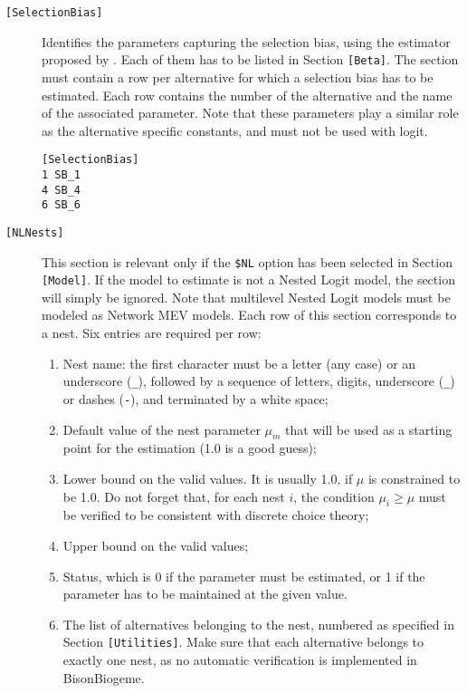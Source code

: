 \documentclass[12pt,a4paper]{article}
\newcommand{\specitem}[1]{\texttt{[#1]}}
\newcommand{\BBIOGEME}{BisonBiogeme}
\begin{document}
\begin{description}
     \item[\specitem{SelectionBias}]
 Identifies the parameters
       capturing the selection bias, using the estimator proposed by . Each of them has to  be listed in
         Section \verb+[Beta]+. The section must contain a
         row per alternative for which a selection bias has to be
         estimated. Each row contains the number of the alternative
         and the name of the associated parameter. Note that these parameters play a similar role as the alternative specific constants, and must not be used with logit. 
\begin{verbatim}
[SelectionBias]
1 SB_1
4 SB_4
6 SB_6
\end{verbatim}
         
      \item[\specitem{NLNests}] This section is relevant only if the
      \verb+$NL+ option has been selected in Section \verb+[Model]+. 
     If the model to estimate is not a  Nested Logit model, the
     section will simply be
       ignored. Note that multilevel Nested Logit models must be modeled as Network MEV models.
      Each row of this section corresponds to a nest. Six entries are required per row:
      \begin{enumerate}
         \item Nest name:   the first character must be a letter (any case) or an underscore
            (\verb+_+), followed by a sequence of letters, digits, underscore (\verb+_+)
            or dashes (\verb+-+), and terminated by a white space;
         \item Default value of the nest parameter $\mu_m$ that will be used as a
            starting point for the estimation (1.0 is a good guess);
         \item Lower bound on the valid values. It is usually 1.0, if $\mu$ is
            constrained to be 1.0. Do not forget that, for each nest $i$, the condition
            $\mu_i \geq \mu$ must be verified to be consistent with discrete choice
            theory;
         \item Upper bound on the valid values;
         \item Status, which is 0 if the parameter must be estimated, or 1 if the parameter has to be maintained at the given value. 
         \item The list of alternatives belonging to the nest, numbered as specified in
            Section \verb+[Utilities]+. Make sure that each alternative
            belongs to exactly one nest, as no automatic verification is implemented in \BBIOGEME.
      \end{enumerate}


\end{description}
\end{document}
